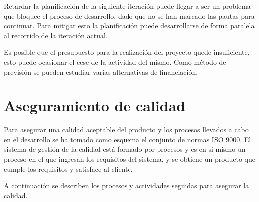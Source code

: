 Retardar la planificación de la siguiente iteración puede llegar a ser un problema que bloquee el proceso de desarrollo, dado que no se han marcado las pautas para 
continuar. Para mitigar esto la planificación puede desarrollarse de forma paralela al recorrido de la iteración actual. 

Es posible que el presupuesto para la realización del proyecto quede insuficiente, esto puede ocasionar el cese de la actividad del mismo. Como método de previsión se 
pueden estudiar varias alternativas de financiación.  

\section{Aseguramiento de calidad}

Para asegurar una calidad aceptable del producto y los procesos llevados a cabo en el desarrollo se ha tomado como esquema el conjunto de normas ISO 9000. 
El sistema de gestión de la calidad está formado por procesos y es en si mismo un proceso en el que ingresan los requisitos del sistema, y se obtiene un
producto que cumple los requisitos y satisface al cliente. 

A continuación se describen los procesos y actividades seguidas para asegurar la calidad.

